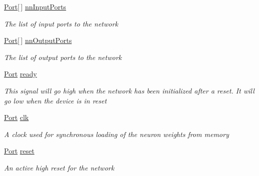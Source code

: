\begin{DoxyCompactItemize}
\item 
\hyperlink{class_n_n_gen_1_1_port}{Port}\mbox{[}$\,$\mbox{]} \hyperlink{class_n_n_gen_1_1_async_neural_network_a6422fde806a9cf2188ca93c5166ebb23}{nn\+Input\+Ports}
\begin{DoxyCompactList}\small\item\em The list of input ports to the network \end{DoxyCompactList}\item 
\hyperlink{class_n_n_gen_1_1_port}{Port}\mbox{[}$\,$\mbox{]} \hyperlink{class_n_n_gen_1_1_async_neural_network_a666078677fa5db12619f912ca472bdee}{nn\+Output\+Ports}
\begin{DoxyCompactList}\small\item\em The list of output ports to the network \end{DoxyCompactList}\item 
\hyperlink{class_n_n_gen_1_1_port}{Port} \hyperlink{class_n_n_gen_1_1_async_neural_network_a30cb0df931a8da4dd7e911f953caaf02}{ready}
\begin{DoxyCompactList}\small\item\em This signal will go high when the network has been initialized after a reset. It will go low when the device is in reset \end{DoxyCompactList}\item 
\hyperlink{class_n_n_gen_1_1_port}{Port} \hyperlink{class_n_n_gen_1_1_async_neural_network_ad3bb38686daf90675f37c81e6b8e749e}{clk}
\begin{DoxyCompactList}\small\item\em A clock used for synchronous loading of the neuron weights from memory \end{DoxyCompactList}\item 
\hyperlink{class_n_n_gen_1_1_port}{Port} \hyperlink{class_n_n_gen_1_1_async_neural_network_a7205fb71714f4aa3c144c72c44af2787}{reset}
\begin{DoxyCompactList}\small\item\em An active high reset for the network \end{DoxyCompactList}\item 

\end{DoxyCompactItemize}
